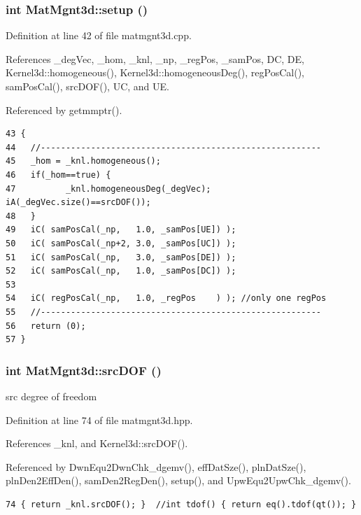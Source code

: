 \subsubsection{\setlength{\rightskip}{0pt plus 5cm}int Mat\-Mgnt3d::setup ()}\label{classMatMgnt3d_415266b005d267e801176f27c0434a50_415266b005d267e801176f27c0434a50}




Definition at line 42 of file matmgnt3d.cpp.

References \_\-deg\-Vec, \_\-hom, \_\-knl, \_\-np, \_\-reg\-Pos, \_\-sam\-Pos, DC, DE, Kernel3d::homogeneous(), Kernel3d::homogeneous\-Deg(), reg\-Pos\-Cal(), sam\-Pos\-Cal(), src\-DOF(), UC, and UE.

Referenced by getmmptr().

\footnotesize\begin{verbatim}43 {
44   //--------------------------------------------------------
45   _hom = _knl.homogeneous();
46   if(_hom==true) {
47          _knl.homogeneousDeg(_degVec); iA(_degVec.size()==srcDOF());
48   }
49   iC( samPosCal(_np,   1.0, _samPos[UE]) );
50   iC( samPosCal(_np+2, 3.0, _samPos[UC]) );
51   iC( samPosCal(_np,   3.0, _samPos[DE]) );
52   iC( samPosCal(_np,   1.0, _samPos[DC]) );
53   
54   iC( regPosCal(_np,   1.0, _regPos    ) ); //only one regPos
55   //--------------------------------------------------------
56   return (0);
57 }
\end{verbatim}\normalsize 


\subsubsection{\setlength{\rightskip}{0pt plus 5cm}int Mat\-Mgnt3d::src\-DOF ()\hspace{0.3cm}{\tt  [inline]}}\label{classMatMgnt3d_6b422ba557bb24eff82ac7125e206568_6b422ba557bb24eff82ac7125e206568}


src degree of freedom 

Definition at line 74 of file matmgnt3d.hpp.

References \_\-knl, and Kernel3d::src\-DOF().

Referenced by Dwn\-Equ2Dwn\-Chk\_\-dgemv(), eff\-Dat\-Sze(), pln\-Dat\-Sze(), pln\-Den2Eff\-Den(), sam\-Den2Reg\-Den(), setup(), and Upw\-Equ2Upw\-Chk\_\-dgemv().

\footnotesize\begin{verbatim}74 { return _knl.srcDOF(); }  //int tdof() { return eq().tdof(qt()); }
\end{verbatim}\normalsize 



